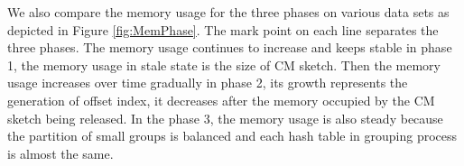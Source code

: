 We also compare the memory usage for the three phases on various data sets as depicted in Figure \ref{fig:MemPhase}. The mark point on each line separates the three phases. The memory usage continues to increase and keeps stable in phase 1, the memory usage in stale state is the size of CM sketch. Then the memory usage increases over time gradually in phase 2, its growth represents the generation of offset index, it decreases after the memory occupied by the CM sketch being released. In the phase 3, the memory usage is also steady because the partition of small groups is balanced and each hash table in grouping process is almost the same.



